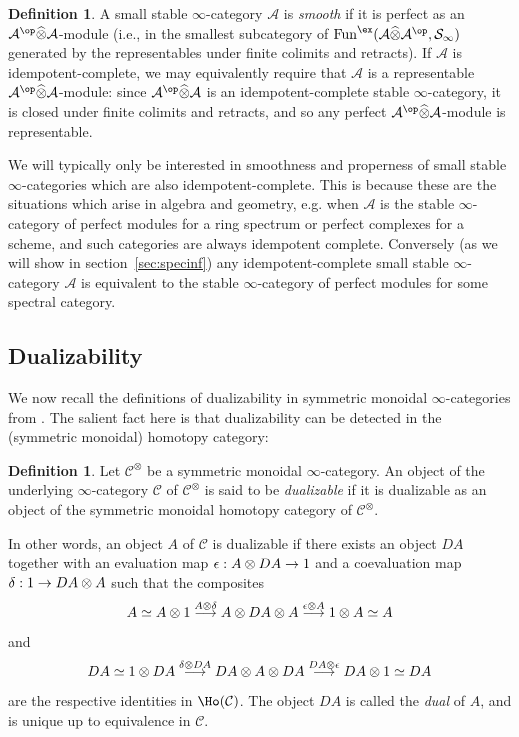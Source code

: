 \documentclass{amsart}
\renewcommand{\to}{\mathchoice{\longrightarrow}{\rightarrow}{\rightarrow}{\rightarrow}}
\let\catsymbfont\mathcal
\newcommand{\aA}{{\catsymbfont{A}}}
\newcommand{\aC}{{\catsymbfont{C}}}
\newcommand{\aS}{{\catsymbfont{S}}}
\newcommand{\idemtimes}{\widehat{\otimes}}
\newcommand{\idemfun}{\Fun^{\ex}}
\newcommand{\Fun}{\mathrm{Fun}} %
\newcommand{\ispec}{\aS_{\infty}}
\renewcommand{\i}{\infty}
\numberwithin{equation}{section}
\theoremstyle{definition}
\newtheorem{definition}[equation]{Definition}
\begin{document}
\begin{definition}\label{def:smooth}
A small stable $\infty$-category $\aA$ is {\em
smooth} if it is perfect as an $\aA^{\op}\idemtimes\aA$-module (i.e.,
in the smallest subcategory of $\idemfun(\aA\idemtimes\aA^{\op}, \ispec)$ generated by
the representables under finite colimits and retracts).  If
$\aA$ is idempotent-complete, we may equivalently require that $\aA$ is a representable
$\aA^{\op}\idemtimes\aA$-module: since $\aA^{\op}\idemtimes\aA$ is an
idempotent-complete stable $\infty$-category, it is closed under
finite colimits and retracts, and so any perfect
$\aA^{\op}\idemtimes\aA$-module is representable.
\end{definition}


We will typically only be interested in smoothness and properness of small stable $\i$-categories which are also idempotent-complete.
This is because these are the situations which arise in algebra and geometry, e.g. when $\aA$ is the stable $\i$-category of perfect modules for a ring spectrum or perfect complexes for a scheme, and such categories
are always idempotent complete. Conversely (as we will show in
section~\ref{sec:specinf}) any idempotent-complete small stable
$\infty$-category $\aA$ is equivalent to the stable $\infty$-category
of perfect modules for some spectral category.

\subsection{Dualizability}
We now recall the definitions of dualizability in symmetric monoidal
$\i$-categories from \cite[\S 4.2.5]{HAG}.  The salient fact here is
that dualizability can be detected in the (symmetric monoidal)
homotopy category:

\begin{definition}
Let $\aC^\otimes$ be a symmetric monoidal $\infty$-category.
An object of the underlying $\infty$-category $\aC$ of $\aC^\otimes$ is said to be {\em dualizable} if it is
dualizable as an object of the symmetric monoidal homotopy category of $\aC^\otimes$.
\end{definition}

In other words, an object $A$ of $\aC$ is dualizable if there 
exists an object $DA$ together with an evaluation map
$\epsilon:A\otimes DA\to 1$ and a coevaluation map $\delta:1\to
DA\otimes A$ such that the composites 
\[
A\simeq A\otimes 1\overset{A\otimes\delta}{\to} A\otimes DA\otimes
A\overset{\epsilon\otimes A}{\to} 1\otimes A\simeq A 
\]
and
\[
DA\simeq 1\otimes DA\overset{\delta\otimes DA}{\to} DA\otimes A\otimes
DA\overset{DA\otimes\epsilon}{\to} DA\otimes 1\simeq DA 
\]
are the respective identities in $\Ho(\aC)$.  The object $DA$ is called the {\em dual} of $A$, and is unique up to equivalence in $\aC$. 
\end{document}
